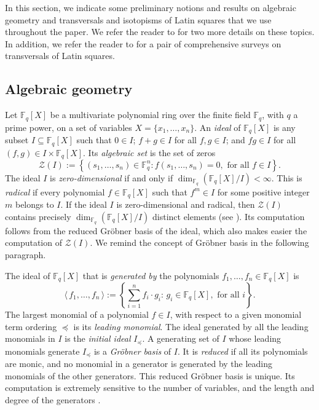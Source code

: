 \documentclass[pdflatex,sn-mathphys-num]{sn-jnl}
\theoremstyle{thmstyleone}%
\begin{document}
In this section, we indicate some preliminary notions and results on algebraic geometry and transversals and isotopisms of Latin squares that we use throughout the paper. We refer the reader to \cite{Cox2015,Keedwell2015} for two more details on these topics. In addition, we refer the reader to \cite{Montgomery2024,Wanless2011} for a pair of comprehensive surveys on transversals of Latin squares.

\subsection{Algebraic geometry}

Let $\mathbb{F}_q[X]$ be a multivariate polynomial ring over the finite field $\mathbb{F}_q$, with $q$ a prime power, on a set of variables $X=\{x_1,\ldots,x_n\}$. An {\em ideal} of $\mathbb{F}_q[X]$ is any subset $I\subseteq \mathbb{F}_q[X]$ such that $0\in I$; $f+g\in I$ for all $f,g\in I$; and $fg\in I$ for all $(f,g)\in I\times \mathbb{F}_q[X]$. Its {\em algebraic set} is the set of zeros
\[\mathcal{Z}(I):=\left\{(s_1,\ldots,s_n)\in\mathbb{F}_q^n\colon f(s_1,\ldots,s_n)=0, \text{ for all } f\in I\right\}.\]
The ideal $I$ is {\em zero-dimensional} if and only if $\dim_{\mathbb{F}_q}\left(\mathbb{F}_q[X] / I\right)<\infty$. This is {\em radical} if every polynomial $f\in \mathbb{F}_q[X]$ such that $f^m\in I$ for some positive integer $m$ belongs to $I$. If the ideal $I$ is zero-dimensional and radical, then $\mathcal{Z}(I)$ contains precisely $\dim_{\mathbb{F}_q}\left(\mathbb{F}_q[X] / I\right)$ distinct elements (see \cite[Theorem 3.7.19]{Kreuzer2000}). Its computation follows from  the reduced Gr\"obner basis of the ideal, which also makes easier the computation of $\mathcal{Z}(I)$. We remind the concept of Gr\"obner basis in the following paragraph.

The ideal of $\mathbb{F}_q[X]$ that is {\em generated by} the polynomials $f_1,\ldots,f_n\in \mathbb{F}_q[X]$ is
\[\langle\,f_1,\ldots,f_n\,\rangle:=\left\{\sum_{i=1}^n f_i\cdot g_i\colon\, g_i\in\mathbb{F}_q[X], \text{ for all } i\right\}.\]
The largest monomial of a polynomial $f\in I$, with respect to a given monomial term ordering $\preceq$ is its {\em leading monomial}. The ideal generated by all the leading monomials in $I$ is the {\em initial ideal} $I_{\preceq}$. A generating set of $I$ whose leading monomials generate $I_{\preceq}$ is a {\em Gr\"obner basis} of $I$. It is {\em reduced} if all its polynomials are monic, and no monomial in a generator is generated by the leading monomials of the other generators. This reduced Gr\"obner basis is unique. Its computation is extremely sensitive to the number of variables, and the length and degree of the generators \cite{Hashemi2011}.
\end{document}
